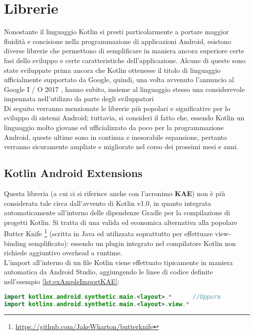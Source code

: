 \section{Librerie}
Nonostante il linguaggio Kotlin si presti particolarmente a portare maggior fluidità e concisione nella programmazione di applicazioni Android, esistono diverse librerie che permettono di semplificare in maniera ancora superiore certe fasi dello sviluppo e certe caratteristiche dell'applicazione. Alcune di queste sono state sviluppate prima ancora che Kotlin ottenesse il titolo di linguaggio ufficialmente supportato da Google, quindi, una volta avvenuto l'annuncio al Google I / O 2017 \cite{googleio}, hanno subito, insieme al linguaggio stesso una considerevole impennata nell'utilizzo da parte degli sviluppatori\\
Di seguito verranno menzionate le librerie più popolari e significative per lo sviluppo di sistemi Android; tuttavia, si consideri il fatto che, essendo Kotlin un linguaggio molto giovane ed ufficializzato da poco per la programmazione Android, queste ultime sono in continua e inesorabile espansione, pertanto verranno sicuramente ampliate e migliorate nel corso dei prossimi mesi e anni.\\

\subsection{Kotlin Android Extensions}
Questa libreria (a cui ci si riferisce anche con l’acronimo {\bfseries KAE}) non è più considerata tale circa dall'avvento di Kotlin v1.0, in quanto integrata automaticamente all'interno delle dipendenze Gradle per la compilazione di progetti Kotlin. Si tratta di una valida ed economica alternativa alla popolare Butter Knife \footnote{\url{https://github.com/JakeWharton/butterknife}} (scritta in Java ed utilizzata soprattutto per effettuare view-binding semplificato): essendo un plugin integrato nel compilatore Kotlin non richiede aggiuntivo overhead a runtime.\\
L'import all'interno di un file Kotlin viene effettuato tipicamente in maniera automatica da Android Studio, aggiungendo le linee di codice definite nell'esempio \ref{lst:exAmpleImportKAE}:\\

\begin{lstlisting}[caption={Import delle Kotlin Android Extensions}, captionpos=b, label={lst:exAmpleImportKAE}, language=Kotlin]
import kotlinx.android.synthetic.main.<layout>.*      //Oppure
import kotlinx.android.synthetic.main.<layout>.view.*
\end{lstlisting}

